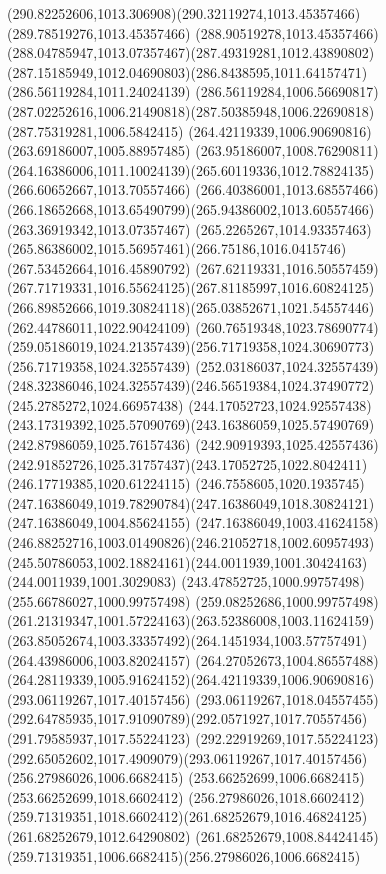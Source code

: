 {{\curveto(290.82252606,1013.306908)(290.32119274,1013.45357466)(289.78519276,1013.45357466)
\curveto(288.90519278,1013.45357466)(288.04785947,1013.07357467)(287.49319281,1012.43890802)
\curveto(287.15185949,1012.04690803)(286.8438595,1011.64157471)(286.56119284,1011.24024139)
\lineto(286.56119284,1006.56690817)
\curveto(287.02252616,1006.21490818)(287.50385948,1006.22690818)(287.75319281,1006.5842415)
\moveto(264.42119339,1006.90690816)
\lineto(263.69186007,1005.88957485)
\lineto(263.95186007,1008.76290811)
\curveto(264.16386006,1011.10024139)(265.60119336,1012.78824135)(266.60652667,1013.70557466)
\curveto(266.40386001,1013.68557466)(266.18652668,1013.65490799)(265.94386002,1013.60557466)
\lineto(263.36919342,1013.07357467)
\lineto(265.2265267,1014.93357463)
\curveto(265.86386002,1015.56957461)(266.75186,1016.0415746)(267.53452664,1016.45890792)
\curveto(267.62119331,1016.50557459)(267.71719331,1016.55624125)(267.81185997,1016.60824125)
\curveto(266.89852666,1019.30824118)(265.03852671,1021.54557446)(262.44786011,1022.90424109)
\curveto(260.76519348,1023.78690774)(259.05186019,1024.21357439)(256.71719358,1024.30690773)
\lineto(256.71719358,1024.32557439)
\lineto(252.03186037,1024.32557439)
\curveto(248.32386046,1024.32557439)(246.56519384,1024.37490772)(245.2785272,1024.66957438)
\curveto(244.17052723,1024.92557438)(243.17319392,1025.57090769)(243.16386059,1025.57490769)
\lineto(242.87986059,1025.76157436)
\lineto(242.90919393,1025.42557436)
\curveto(242.91852726,1025.31757437)(243.17052725,1022.8042411)(246.17719385,1020.61224115)
\curveto(246.7558605,1020.1935745)(247.16386049,1019.78290784)(247.16386049,1018.30824121)
\lineto(247.16386049,1004.85624155)
\curveto(247.16386049,1003.41624158)(246.88252716,1003.01490826)(246.21052718,1002.60957493)
\curveto(245.50786053,1002.18824161)(244.0011939,1001.30424163)(244.0011939,1001.3029083)
\lineto(243.47852725,1000.99757498)
\lineto(255.66786027,1000.99757498)
\curveto(259.08252686,1000.99757498)(261.21319347,1001.57224163)(263.52386008,1003.11624159)
\curveto(263.85052674,1003.33357492)(264.1451934,1003.57757491)(264.43986006,1003.82024157)
\curveto(264.27052673,1004.86557488)(264.28119339,1005.91624152)(264.42119339,1006.90690816)
\moveto(293.06119267,1017.40157456)
\lineto(293.06119267,1018.04557455)
\curveto(292.64785935,1017.91090789)(292.0571927,1017.70557456)(291.79585937,1017.55224123)
\curveto(292.22919269,1017.55224123)(292.65052602,1017.4909079)(293.06119267,1017.40157456)
\moveto(256.27986026,1006.6682415)
\lineto(253.66252699,1006.6682415)
\lineto(253.66252699,1018.6602412)
\lineto(256.27986026,1018.6602412)
\curveto(259.71319351,1018.6602412)(261.68252679,1016.46824125)(261.68252679,1012.64290802)
\curveto(261.68252679,1008.84424145)(259.71319351,1006.6682415)(256.27986026,1006.6682415)
}
}
